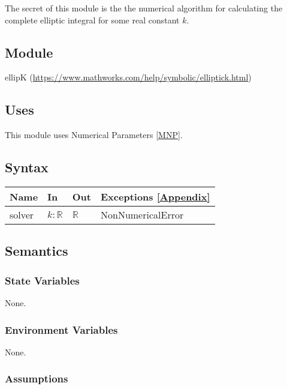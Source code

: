 \documentclass[12pt, titlepage]{article}
\begin{document}
The secret of this module is the the numerical algorithm for calculating the 
complete 
elliptic integral for some real constant $k$.

\subsection{Module}

ellipK (\url{https://www.mathworks.com/help/symbolic/elliptick.html})

\subsection{Uses}

This module uses Numerical Parameters \ref{MNP}. 

\subsection{Syntax}

\begin{center}
	\begin{tabular}{p{2cm} p{4cm} p{4cm} p{3cm}}
		\hline
		\textbf{Name} & \textbf{In} & \textbf{Out} & \textbf{Exceptions} 
		\ref{Appendix} \\
		\hline
		solver & $k : \mathbb{R}$ & $\mathbb{R}$ & 
		NonNumericalError \\ 
		\hline
	\end{tabular}
\end{center}

\subsection{Semantics}

\subsubsection{State Variables}

None.

\subsubsection{Environment Variables}

None.

\subsubsection{Assumptions}
\end{document}
